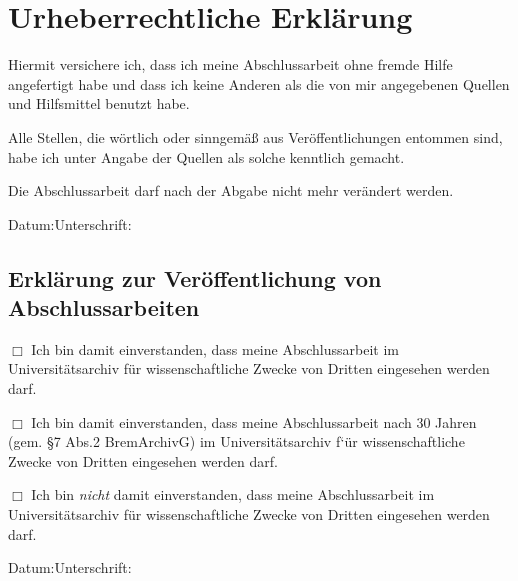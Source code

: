 \chapter*{Urheberrechtliche Erklärung}
\thispagestyle{iat-conformity}
Hiermit versichere ich, dass ich meine Abschlussarbeit ohne fremde Hilfe angefertigt habe und dass ich keine Anderen als die von mir angegebenen Quellen und Hilfsmittel benutzt habe.\par
Alle Stellen, die wörtlich oder sinngemä{\ss} aus Veröffentlichungen entommen sind, habe ich unter Angabe der Quellen als solche kenntlich gemacht.\par
Die Abschlussarbeit darf nach der Abgabe nicht mehr verändert werden.\par
\vspace{2.5em}
Datum:\underline{\hspace{3.5cm}}\qquad Unterschrift:\underline{\hspace{5.5cm}}
\vspace{3em}
\section*{Erklärung zur Veröffentlichung von Abschlussarbeiten}
$\Box$ Ich bin damit einverstanden, dass meine Abschlussarbeit im Universitätsarchiv für wissenschaftliche Zwecke von Dritten eingesehen werden darf.\par
$\Box$ Ich bin damit einverstanden, dass meine Abschlussarbeit nach 30 Jahren (gem. §7 Abs.2 BremArchivG) im Universitätsarchiv f`ür wissenschaftliche Zwecke von Dritten eingesehen werden darf.\par
$\Box$ Ich bin \textit{nicht} damit einverstanden, dass meine Abschlussarbeit im Universitätsarchiv für wissenschaftliche Zwecke von Dritten eingesehen werden darf.\par
\vspace{2.5em}
Datum:\underline{\hspace{3.5cm}}\qquad Unterschrift:\underline{\hspace{5.5cm}}
